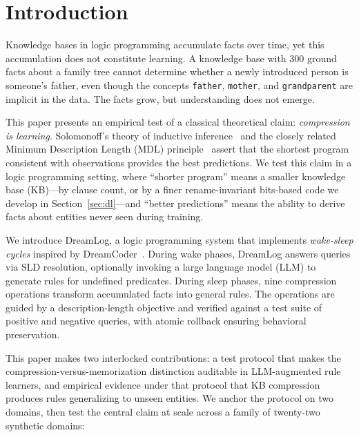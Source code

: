 \documentclass[10pt,conference]{IEEEtran}
\begin{document}
\section{Introduction}
\label{sec:intro}

Knowledge bases in logic programming accumulate facts over time, yet this accumulation does not constitute learning. A knowledge base with 300 ground facts about a family tree cannot determine whether a newly introduced person is someone's father, even though the concepts \texttt{father}, \texttt{mother}, and \texttt{grandparent} are implicit in the data. The facts grow, but understanding does not emerge.

This paper presents an empirical test of a classical theoretical claim: \emph{compression is learning}. Solomonoff's theory of inductive inference~\cite{solomonoff1964formal} and the closely related Minimum Description Length (MDL) principle~\cite{rissanen1978modeling,grunwald2007minimum} assert that the shortest program consistent with observations provides the best predictions. We test this claim in a logic programming setting, where ``shorter program'' means a smaller knowledge base (KB)---by clause count, or by a finer rename-invariant bits-based code we develop in Section~\ref{sec:dl}---and ``better predictions'' means the ability to derive facts about entities never seen during training.

We introduce DreamLog, a logic programming system that implements \emph{wake-sleep cycles} inspired by DreamCoder~\cite{ellis2021dreamcoder}. During wake phases, DreamLog answers queries via SLD resolution, optionally invoking a large language model (LLM) to generate rules for undefined predicates. During sleep phases, nine compression operations transform accumulated facts into general rules. The operations are guided by a description-length objective and verified against a test suite of positive and negative queries, with atomic rollback ensuring behavioral preservation.

This paper makes two interlocked contributions: a test protocol that makes the compression-versus-memorization distinction auditable in LLM-augmented rule learners, and empirical evidence under that protocol that KB compression produces rules generalizing to unseen entities. We anchor the protocol on two domains, then test the central claim at scale across a family of twenty-two synthetic domains:
\end{document}

